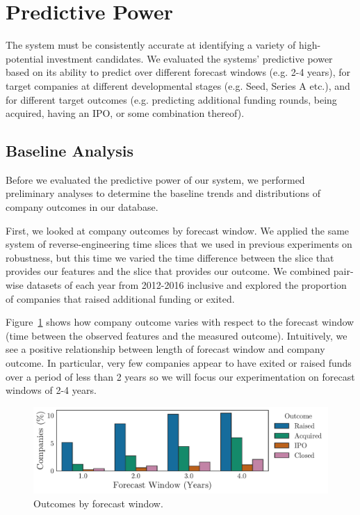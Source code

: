 \documentclass[../thesis/thesis.tex]{subfiles}
\begin{document}
\section{Predictive Power}

The system must be consistently accurate at identifying a variety of high-potential investment candidates. We evaluated the systems' predictive power based on its ability to predict over different forecast windows (e.g. 2-4 years), for target companies at different developmental stages (e.g. Seed, Series A etc.), and for different target outcomes (e.g. predicting additional funding rounds, being acquired, having an IPO, or some combination thereof).

\subsection{Baseline Analysis}

Before we evaluated the predictive power of our system, we performed preliminary analyses to determine the baseline trends and distributions of company outcomes in our database.

First, we looked at company outcomes by forecast window. We applied the same system of reverse-engineering time slices that we used in previous experiments on robustness, but this time we varied the time difference between the slice that provides our features and the slice that provides our outcome. We combined pair-wise datasets of each year from 2012-2016 inclusive and explored the proportion of companies that raised additional funding or exited.

Figure~\ref{fig:evaluation:outcome_forecast_window} shows how company outcome varies with respect to the forecast window (time between the observed features and the measured outcome). Intuitively, we see a positive relationship between length of forecast window and company outcome. In particular, very few companies appear to have exited or raised funds over a period of less than 2 years so we will focus our experimentation on forecast windows of 2-4 years.

\begin{figure}[!htb]
    \centering
    \includegraphics[width=\textwidth]{../figures/evaluation/outcomes_window}
    \caption[Outcomes by forecast window]{Outcomes by forecast window.}
    \label{fig:evaluation:outcome_forecast_window}
\end{figure}
\end{document}
